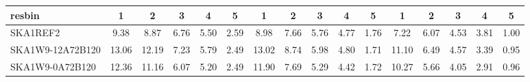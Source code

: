 \begin{table}[!htp]
{{\begin{tabular}{|lccccc||ccccc||ccccc|}
 resbin  &1 & 2 & 3 & 4 & 5 & 1 & 2 & 3 & 4 & 5 & 1 & 2 & 3 & 4 & 5 \\ \hline
SKA1REF2 & 9.38 \cellcolor{blue!18.00} & 8.87 \cellcolor{red!18.00} & 6.76 \cellcolor{green!42.98} & 5.50 \cellcolor{orange!39.36} & 2.59 \cellcolor{purple!60.00} & 8.98 \cellcolor{blue!18.00} & 7.66 \cellcolor{red!18.00} & 5.76 \cellcolor{green!46.61} & 4.77 \cellcolor{orange!56.68} & 1.76 \cellcolor{purple!60.00} & 7.22 \cellcolor{blue!18.00} & 6.07 \cellcolor{red!38.75} & 4.53 \cellcolor{green!56.77} & 3.81 \cellcolor{orange!60.00} & 1.00 \cellcolor{purple!60.00}\\ \hline 
SKA1W9-12A72B120 & 13.06 \cellcolor{blue!60.00} & 12.19 \cellcolor{red!60.00} & 7.23 \cellcolor{green!60.00} & 5.79 \cellcolor{orange!60.00} & 2.49 \cellcolor{purple!18.00} & 13.02 \cellcolor{blue!60.00} & 8.74 \cellcolor{red!60.00} & 5.98 \cellcolor{green!60.00} & 4.80 \cellcolor{orange!60.00} & 1.71 \cellcolor{purple!18.00} & 11.10 \cellcolor{blue!60.00} & 6.49 \cellcolor{red!60.00} & 4.57 \cellcolor{green!60.00} & 3.39 \cellcolor{orange!40.40} & 0.95 \cellcolor{purple!18.00}\\ \hline 
SKA1W9-0A72B120 & 12.36 \cellcolor{blue!52.01} & 11.16 \cellcolor{red!46.97} & 6.07 \cellcolor{green!18.00} & 5.20 \cellcolor{orange!18.00} & 2.49 \cellcolor{purple!18.00} & 11.90 \cellcolor{blue!48.36} & 7.69 \cellcolor{red!19.17} & 5.29 \cellcolor{green!18.00} & 4.42 \cellcolor{orange!18.00} & 1.72 \cellcolor{purple!26.40} & 10.27 \cellcolor{blue!51.02} & 5.66 \cellcolor{red!18.00} & 4.05 \cellcolor{green!18.00} & 2.91 \cellcolor{orange!18.00} & 0.96 \cellcolor{purple!26.40}\\ \hline 
\end{tabular}}
\hspace{1cm} 
}
\end{table}
